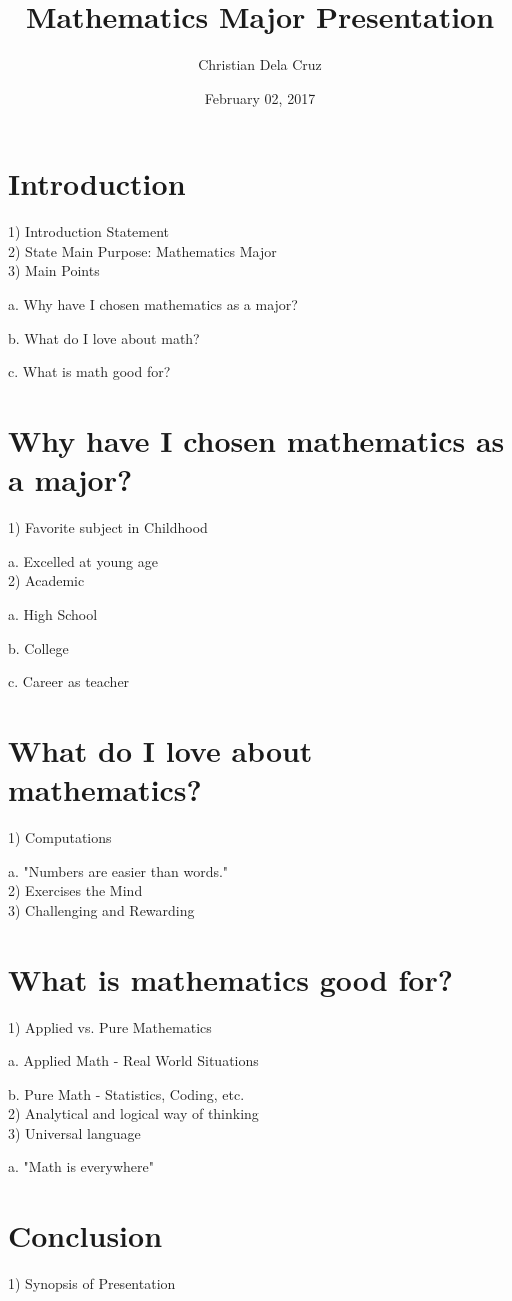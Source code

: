 \documentclass[12pt, oneside]{article}   	%
\title{Mathematics Major Presentation}
\author{Christian Dela Cruz}
\date{February 02, 2017}							%
\begin{document}
{\selectfont
}	
\maketitle
\section{Introduction}
1) Introduction Statement\\
2) State Main Purpose: Mathematics Major\\
3) Main Points\par
a. Why have I chosen mathematics as a major?\par	
b. What do I love about math?\par
c. What is math good for?\\
\section{Why have I chosen mathematics as a major?}
1) Favorite subject in Childhood\par
a. Excelled at young age\\
2) Academic\par
a. High School\par
b. College\par
c. Career as teacher\\
\section{What do I love about mathematics?}
1) Computations\par
a. "Numbers are easier than words."\\
2) Exercises the Mind\\
3) Challenging and Rewarding\\
\section{What is mathematics good for?}
1) Applied vs. Pure Mathematics\par
a. Applied Math - Real World Situations\par
b. Pure Math - Statistics, Coding, etc.\\
2) Analytical and logical way of thinking\\
3) Universal language\par
a. "Math is everywhere"\\
\section{Conclusion}
1) Synopsis of Presentation
\end{document}
